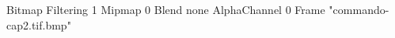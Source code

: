 {Bitmap
	{Filtering 1}
	{Mipmap 0}
	{Blend none}
	{AlphaChannel 0}
	{Frame "commando-cap2.tif.bmp"}
}
